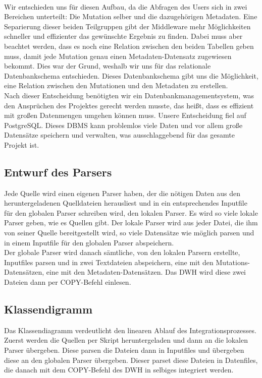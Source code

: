 \\
Wir entschieden uns für diesen Aufbau, da die Abfragen des Users sich in zwei Bereichen unterteilt: Die Mutation selber und die dazugehörigen Metadaten. Eine Separierung dieser beiden Teilgruppen gibt der Middleware mehr Möglichkeiten schneller und effizienter das gewünschte Ergebnis zu finden. Dabei muss aber beachtet werden, dass es noch eine Relation zwischen den beiden Tabellen geben muss, damit jede Mutation genau einen Metadaten-Datensatz zugewiesen bekommt. Dies war der Grund, weshalb wir uns für das relationale Datenbankschema entschieden. Dieses Datenbankschema gibt uns die Möglichkeit, eine Relation zwischen den Mutationen und den Metadaten zu erstellen.\\
Nach dieser Entscheidung benötigten wir ein Datenbankmanagementsystem, was den Ansprüchen des Projektes gerecht werden musste, das heißt, dass es effizient mit großen Datenmengen umgehen können muss. Unsere Entscheidung fiel auf PostgreSQL. Dieses DBMS kann problemlos viele Daten und vor allem große Datensätze speichern und verwalten, was ausschlaggebend für das gesamte Projekt ist.
\subsection{Entwurf des Parsers}
Jede Quelle wird einen eigenen Parser haben, der die nötigen Daten aus den heruntergeladenen Quelldateien herausliest und in ein entsprechendes Inputfile für den globalen Parser schreiben wird, den lokalen Parser. Es wird so viele lokale Parser geben, wie es Quellen gibt. Der lokale Parser wird aus jeder Datei, die ihm von seiner Quelle bereitgestellt wird, so viele Datensätze wie möglich parsen und in einem Inputfile für den globalen Parser abspeichern.\\
Der globale Parser wird danach sämtliche, von den lokalen Parsern erstellte, Inputfiles parsen und in zwei Textdateien abspeichern, eine mit den Mutations-Datensätzen, eine mit den Metadaten-Datensätzen. Das DWH wird diese zwei Dateien dann per COPY-Befehl einlesen. 
\subsection{Klassendigramm}
Das Klassendiagramm verdeutlicht den linearen Ablauf des Integrationsprozesses. Zuerst werden die Quellen per Skript heruntergeladen und dann an die lokalen Parser übergeben. Diese parsen die Dateien dann in Inputfiles und übergeben diese an den globalen Parser übergeben. Dieser parset diese Dateien in Datenfiles, die danach mit dem COPY-Befehl des DWH in selbiges integriert werden.
